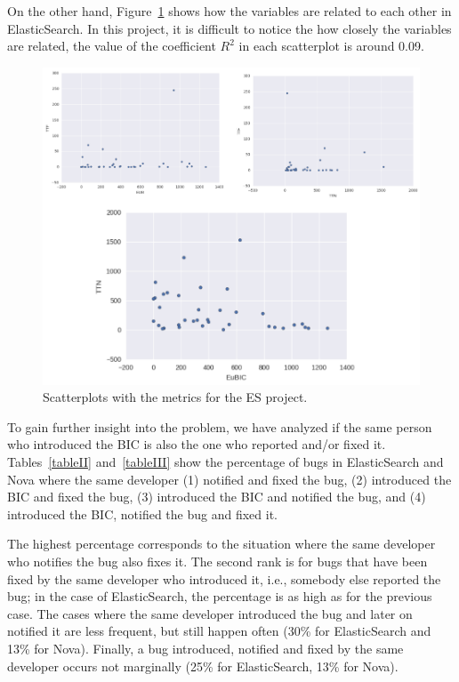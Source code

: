 \documentclass[10pt, conference]{IEEEtran}
\begin{document}
On the other hand, Figure~\ref{fig:graph1} shows how the variables are related to each other in ElasticSearch. In this project, it is difficult to notice the how closely the variables are related, the value of the coefficient $R^2$ in each scatterplot is around 0.09. 

\begin{figure}[ht]
\centering
\includegraphics[width=\columnwidth]{DistributionES_b.png}
\caption{Scatterplots with the metrics for the ES project.}
\label{fig:graph1}       %
\end{figure}


To gain further insight into the problem, we have analyzed if the same person who introduced the BIC is also the one who reported and/or fixed it. Tables~\ref{tableII} and~\ref{tableIII} show the percentage of bugs in ElasticSearch and Nova where the same developer (1) notified and fixed the bug, (2) introduced the BIC and fixed the bug, (3) introduced the BIC and notified the bug, and (4) introduced the BIC, notified the bug and fixed it.

The highest percentage corresponds to the situation where the same developer who notifies the bug also fixes it. The second rank is for bugs that have been fixed by the same developer who introduced it, i.e., somebody else reported the bug; in the case of ElasticSearch, the percentage is as high as for the previous case. The cases where the same developer introduced the bug and later on notified it are less frequent, but still happen often (30\% for ElasticSearch and 13\% for Nova). Finally, a bug introduced, notified and fixed by the same developer occurs not marginally (25\% for ElasticSearch, 13\% for Nova).
\end{document}
